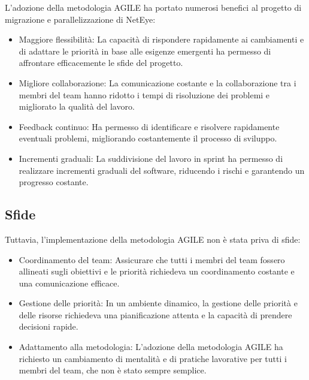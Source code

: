 L'adozione della metodologia AGILE ha portato numerosi benefici al progetto di
migrazione e parallelizzazione di NetEye:
\begin{itemize}
  \item Maggiore flessibilità: La capacità di rispondere rapidamente ai
    cambiamenti e di adattare le priorità in base alle esigenze emergenti ha
    permesso di affrontare efficacemente le sfide del progetto.

  \item Migliore collaborazione: La comunicazione costante e la collaborazione
    tra i membri del team hanno ridotto i tempi di risoluzione dei problemi e
    migliorato la qualità del lavoro.

  \item Feedback continuo: Ha permesso di identificare e risolvere rapidamente
    eventuali problemi, migliorando costantemente il processo di sviluppo.

  \item Incrementi graduali: La suddivisione del lavoro in sprint ha permesso di
    realizzare incrementi graduali del software, riducendo i rischi e garantendo
    un progresso costante.
\end{itemize}

\subsection{Sfide}
\label{sub:sfide}

Tuttavia, l'implementazione della metodologia AGILE non è stata priva di sfide:
\begin{itemize}
  \item Coordinamento del team: Assicurare che tutti i membri del team fossero
    allineati sugli obiettivi e le priorità richiedeva un coordinamento costante
    e una comunicazione efficace.

  \item Gestione delle priorità: In un ambiente dinamico, la gestione delle priorità
    e delle risorse richiedeva una pianificazione attenta e la capacità di prendere
    decisioni rapide.

  \item Adattamento alla metodologia: L'adozione della metodologia AGILE ha
    richiesto un cambiamento di mentalità e di pratiche lavorative per tutti i
    membri del team, che non è stato sempre semplice.
\end{itemize}